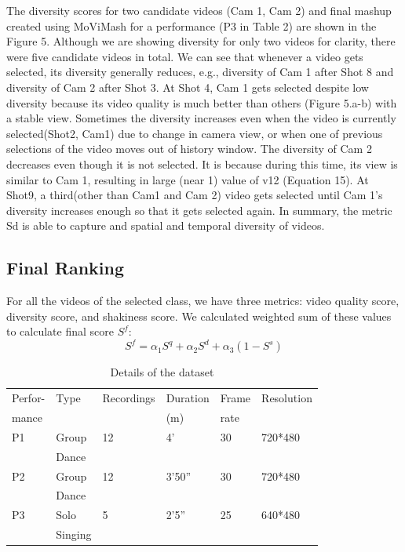 \documentclass{sig-alternate}
\begin{document}
The diversity scores for two candidate videos (Cam 1, Cam 2) and final mashup created using MoViMash for a performance (P3 in Table 2) are shown in the Figure 5. Although we are showing diversity for only two videos for clarity, there were ﬁve candidate videos in total. We can see that whenever a video gets selected, its diversity generally reduces, e.g., diversity of Cam 1 after Shot 8 and diversity of Cam 2 after Shot 3. At Shot 4, Cam 1 gets selected despite low diversity because its video quality is much better than others (Figure 5.a-b) with a stable view. Sometimes the diversity increases even when the video is currently selected(Shot2, Cam1) due to change in camera view, or when one of previous selections of the video moves out of history window. The diversity of Cam 2 decreases even though it is not selected. It is because during this time, its view is similar to Cam 1, resulting in large (near 1) value of v12 (Equation 15). At Shot9, a third(other than Cam1 and Cam 2) video gets selected until Cam 1's diversity increases enough so that it gets selected again. In summary, the metric Sd is able to capture and spatial and temporal diversity of videos. 

\subsection{Final Ranking}
For all the videos of the selected class, we have three metrics: video quality score, diversity score, and shakiness score. We calculated weighted sum of these values to calculate ﬁnal score \(S^f\):
\begin{equation}
 S^f = \alpha_1S^q + \alpha_2S^d + \alpha_3(1 - S^s)
\end{equation}

\begin{table}
\centering
\caption{ Details of the dataset }
\begin{tabular}{p{1cm}|p{0.9cm}|p{1.4cm}|p{1.3cm}|p{0.8cm}|p{1.3cm}} \hline
Perfor-&Type &Recordings &Duration&Frame&Resolution \\ 
mance & & & (m)&rate& \\ \hline
P1 &Group&12 &4' &30 &720*480\\
&Dance&&&&\\ \hline
P2 &Group&12 &3'50'' &30& 720*480\\
&Dance&&&&\\ \hline
P3& Solo&5 &2'5'' &25 &640*480\\
&Singing&&&&\\ \hline

\end{tabular}
\end{table}
\end{document}
